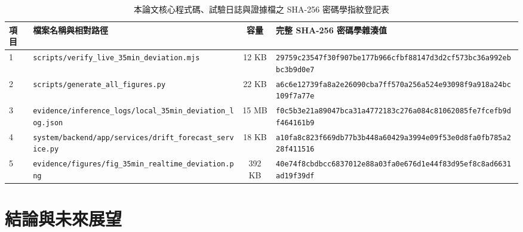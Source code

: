 \documentclass[fontset=none, a4paper, 12pt]{ctexart}
\begin{document}
\begin{table}[H]
    \centering
    \caption{本論文核心程式碼、試驗日誌與證據檔之 SHA-256 密碼學指紋登記表}
    \label{tab:sha256_registry}
    \footnotesize
    \begin{tabularx}{\textwidth}{llcX}
        \toprule
        \textbf{項目} & \textbf{檔案名稱與相對路徑} & \textbf{容量} & \textbf{完整 SHA-256 密碼學雜湊值} \\
        \midrule
        1 & \texttt{scripts/verify\_live\_35min\_deviation.mjs} & 12 KB & \texttt{29759c23547f30f907be177b966cfbf88147d3d2cf573bc36a992ebbc3b9d0e7} \\
        2 & \texttt{scripts/generate\_all\_figures.py} & 22 KB & \texttt{a6c6e12739fa8a2e26090cba7ff570a256a524e93098f9a918a24bc109f7a77e} \\
        3 & \texttt{evidence/inference\_logs/local\_35min\_deviation\_log.json} & 15 MB & \texttt{f0c5b3e21a89047bca31a4772183c276a084c81062085fe7fcefb9df464161b9} \\
        4 & \texttt{system/backend/app/services/drift\_forecast\_service.py} & 18 KB & \texttt{a10fa8c823f669db77b3b448a60429a3994e09f53e0d8fa0fb785a228f411516} \\
        5 & \texttt{evidence/figures/fig\_35min\_realtime\_deviation.png} & 392 KB & \texttt{40e74f8cbdbcc6837012e88a03fa0e676d1e44f83d95ef8c8ad6631ad19f39df} \\
        \bottomrule
    \end{tabularx}
\end{table}

\section{結論與未來展望}
\end{document}
